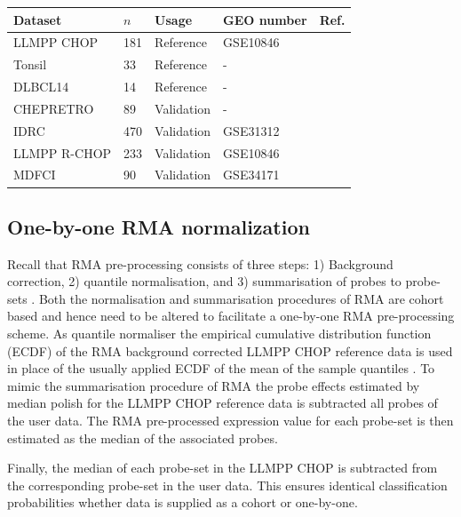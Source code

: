 \documentclass[10pt]{bmc_article}
\newenvironment{bmcformat}{\fussy\setboolean{publ}{true}}{\fussy}
\newenvironment{Table}
  {\par\bigskip\noindent\minipage{\columnwidth}\centering}
  {\endminipage\par\bigskip}
\begin{document}
\begin{bmcformat}
\begin{Table}%
\small
{}
\label{table:01}%
\begin{center}
\begin{tabular*}{\columnwidth}{lllll}
\toprule
Dataset & $n$ & Usage & GEO number & Ref.
\\
\hline
LLMPP CHOP & 181 & Reference & GSE10846 & \cite{Lenz2008a}
\\
Tonsil & 33 & Reference & - & \cite{Dybkaer2013}
\\
DLBCL14 & 14 & Reference & - & \cite{Falgreen2013c}
\\
CHEPRETRO & 89 & Validation & - & \cite{Dybkaer2013}
\\
IDRC & 470 & Validation & GSE31312 & \cite{Visco2012}
\\
LLMPP R-CHOP & 233 & Validation & GSE10846 & \cite{Lenz2008a}
\\
MDFCI & 90 & Validation & GSE34171 & \cite{Monti2012a}\\
\bottomrule
\end{tabular*}
\end{center}
\end{Table}

\subsection*{One-by-one RMA normalization}
Recall that RMA pre-processing consists of three steps: 1) Background correction, 2) quantile normalisation, and 3) summarisation of probes to probe-sets \cite{Irizarry2003}. Both the normalisation and summarisation procedures of RMA are cohort based and hence need to be altered to facilitate a one-by-one RMA pre-processing scheme. As quantile normaliser the empirical cumulative distribution function (ECDF) of the RMA background corrected LLMPP CHOP reference data is used in place of the usually applied ECDF of the mean of the sample quantiles \cite{Bolstad2003}. To mimic the summarisation procedure of RMA \cite{Irizarry2003b} the probe effects estimated by median polish for the LLMPP CHOP reference data is subtracted all probes of the user data. The RMA pre-processed expression value for each probe-set is then estimated as the median of the associated probes.

Finally, the median of each probe-set in the LLMPP CHOP is subtracted from the corresponding probe-set in the user data. This ensures identical classification probabilities whether data is supplied as a cohort or one-by-one.


\end{bmcformat}
\end{document}
